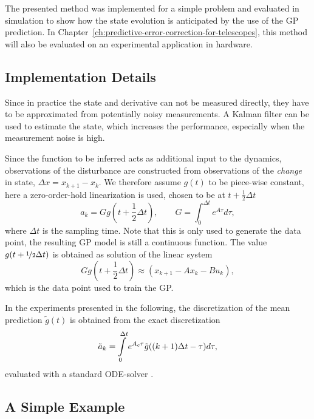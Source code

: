 The presented method was implemented for a simple problem and evaluated in
simulation to show how the state evolution is anticipated by the use of the GP
prediction. In Chapter~\ref{ch:predictive-error-correction-for-telescopes},
this method will also be evaluated on an experimental application in hardware.

\subsection{Implementation Details}
\label{sec:implementation_details}

Since in practice the state and derivative can not be measured directly, they
have to be approximated from potentially noisy measurements. A Kalman filter
\cite{Kalman:1960:New} can be used to estimate the state, which increases the
performance, especially when the measurement noise is high.

Since the function to be inferred acts as additional input to the dynamics,
observations of the disturbance are constructed from observations of the
\emph{change} in state, $\Delta x = x_{k+1} - x_k $. We therefore assume
$g(t)$ to be piece-wise constant, here a zero-order-hold linearization is used,
chosen to be at $t+\frac{1}{2}\Delta t$
\begin{equation}
  a_k = G g(t+\frac{1}{2}\Delta t), \qquad G = \int_0^{\Delta
t}e^{A\tau}d\tau,
\end{equation}
where $\Delta t$ is the sampling time. Note that this is only used to generate
the data point, the resulting GP model is still a continuous function.
The value $g(t+\nicefrac{1}{2}\Delta t)$ is obtained as solution of the linear
system
\begin{equation}
  G g(t+\frac{1}{2}\Delta t) \approx \left(x_{k+1} - A x_k - B u_k\right),
\end{equation}
which is the data point used to train the GP.

In the experiments presented in the following, the discretization of the
mean prediction $\tilde g(t)$ is obtained from the exact
discretization
\begin{equation}
\label{eq:affine_convolution}
 \tilde a_k = \intl_{0}^{\Delta t} e^{A_c\tau} \tilde g({(k+1)\Delta
t}-\tau)d\tau ,
\end{equation}
evaluated with a standard ODE-solver \cite{Dormand.Prince:1980:family}.

\subsection{A Simple Example}
\label{sec:toy_problem}

